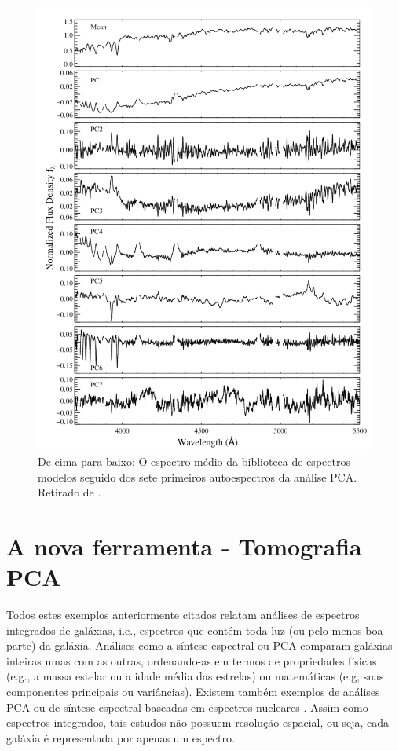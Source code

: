 \begin{figure}
    \includegraphics[height=1.\textwidth]{figuras/figChen2012fig2.pdf}
    \caption[Espectro médio e 7 primeiras PCs de uma biblioteca de modelos.]
    {De cima para baixo: O espectro médio da biblioteca de espectros modelos seguido dos sete primeiros autoespectros
    da análise PCA. Retirado de \citet{Chen2012}.}
    \label{fig:Chen2012fig2}
\end{figure}

\section{A nova ferramenta - Tomografia PCA}
\label{sec:Intro:TomoPCA}

Todos estes exemplos anteriormente citados relatam análises de espectros integrados de galáxias, i.e., espectros que
contém toda luz (ou pelo menos boa parte) da galáxia. Análises como a síntese espectral ou PCA comparam galáxias
inteiras umas com as outras, ordenando-as em termos de propriedades físicas (e.g., a massa estelar ou a idade média das
estrelas) ou matemáticas (e.g, suas componentes principais ou variâncias). Existem também exemplos de análises PCA ou de
síntese espectral baseadas em espectros nucleares \citep[e.g., ][]{Trager2000I, CidFernandes2004}. Assim como espectros
integrados, tais estudos não possuem resolução espacial, ou seja, cada galáxia é representada por apenas um espectro.


